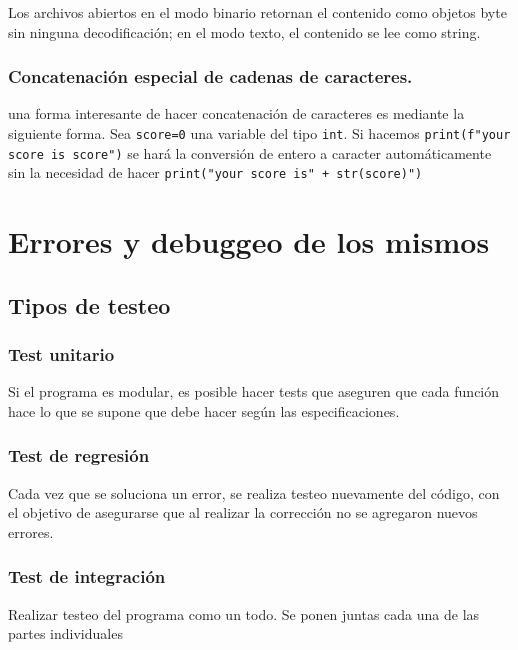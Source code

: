 Los archivos abiertos en el modo binario retornan el contenido como objetos byte sin ninguna decodificación; en el modo texto, el contenido se lee como string.

\subsubsection{Concatenación especial de cadenas de caracteres.}

una forma interesante de hacer concatenación de caracteres es mediante la siguiente forma. Sea \texttt{score=0} una variable del tipo \texttt{int}. Si hacemos \texttt{print(f"your score is {score}")} se hará la conversión de entero a caracter automáticamente sin la necesidad de hacer \texttt{print("your score is" + str(score)")}





\section{Errores y debuggeo de los mismos}

\subsection{Tipos de testeo}

\subsubsection{Test unitario}

Si el programa es modular, es posible hacer tests que aseguren que cada función hace lo que se supone que debe hacer según las especificaciones.

\subsubsection*{Test de regresión}

Cada vez que se soluciona un error, se realiza testeo nuevamente del código, con el objetivo de asegurarse que al realizar la corrección no se agregaron nuevos errores. 

\subsubsection*{Test de integración}

Realizar testeo del programa como un todo. Se ponen juntas cada una de las partes individuales 

